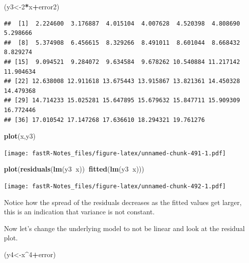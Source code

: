 \documentclass[]{book}
\newenvironment{Shaded}{\begin{snugshade}}{\end{snugshade}}
\newcommand{\KeywordTok}[1]{\textcolor[rgb]{0.13,0.29,0.53}{\textbf{#1}}}
\newcommand{\DecValTok}[1]{\textcolor[rgb]{0.00,0.00,0.81}{#1}}
\newcommand{\OperatorTok}[1]{\textcolor[rgb]{0.81,0.36,0.00}{\textbf{#1}}}
\newcommand{\NormalTok}[1]{#1}
\theoremstyle{definition}
\theoremstyle{definition}
\theoremstyle{definition}
\theoremstyle{remark}
\begin{document}
\begin{Shaded}
\begin{Highlighting}[]
\NormalTok{(y3<-}\DecValTok{2}\OperatorTok{*}\NormalTok{x}\OperatorTok{+}\NormalTok{error2)}
\end{Highlighting}
\end{Shaded}

\begin{verbatim}
##  [1]  2.224600  3.176887  4.015104  4.007628  4.520398  4.808690  5.298666
##  [8]  5.374908  6.456615  8.329266  8.491011  8.601044  8.668432  8.829274
## [15]  9.094521  9.284072  9.634584  9.678262 10.540884 11.217142 11.904634
## [22] 12.638008 12.911618 13.675443 13.915867 13.821361 14.450328 14.479368
## [29] 14.714233 15.025281 15.647895 15.679632 15.847711 15.909309 16.772446
## [36] 17.010542 17.147268 17.636610 18.294321 19.761276
\end{verbatim}

\begin{Shaded}
\begin{Highlighting}[]
\KeywordTok{plot}\NormalTok{(x,y3)}
\end{Highlighting}
\end{Shaded}

\texttt{[image: fastR-Notes\_files/figure-latex/unnamed-chunk-491-1.pdf]}

\begin{Shaded}
\begin{Highlighting}[]
\KeywordTok{plot}\NormalTok{(}\KeywordTok{residuals}\NormalTok{(}\KeywordTok{lm}\NormalTok{(y3}\OperatorTok{~}\NormalTok{x))}\OperatorTok{~}\KeywordTok{fitted}\NormalTok{(}\KeywordTok{lm}\NormalTok{(y3}\OperatorTok{~}\NormalTok{x)))}
\end{Highlighting}
\end{Shaded}

\texttt{[image: fastR-Notes\_files/figure-latex/unnamed-chunk-492-1.pdf]}

Notice how the spread of the residuals decreases as the fitted values
get larger, this is an indication that variance is not constant.

Now let's change the underlying model to not be linear and look at the
residual plot.

\begin{Shaded}
\begin{Highlighting}[]
\NormalTok{(y4<-x}\OperatorTok{^}\DecValTok{4}\OperatorTok{+}\NormalTok{error)}
\end{Highlighting}
\end{Shaded}
\end{document}

